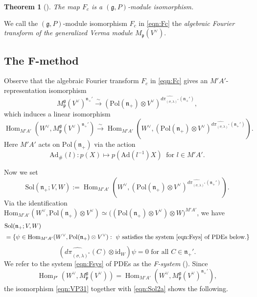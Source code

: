 \documentclass[reqno,11pt]{amsart}
\newtheorem{thm}[equation]{Theorem}
\theoremstyle{remark}
\theoremstyle{definition}
\numberwithin{equation}{section}
\newcommand{\fg}{{\mathfrak g}}
\newcommand{\fn}{{\mathfrak n}}
\newcommand{\fp}{{\mathfrak p}}
\newcommand{\Ad}{\mathrm{Ad}}
\newcommand{\Hom}{\operatorname{Hom}}
\newcommand{\Sol}{\mathrm{Sol}}
\newcommand{\Pol}{\mathrm{Pol}}
\newcommand{\To}{\longrightarrow}
\newcommand{\id}{\mathrm{id}}
\newcommand{\Mp}{M^{\fg}_{\fp}}
\begin{document}
\begin{thm}[{\cite[Sect.\ 3.4]{KP1}}]\label{def:AFT2}
The map $F_c$  is  a $(\mathfrak{g}, P)$-module isomorphism.
\end{thm}

We call 
the $(\mathfrak{g}, P)$-module isomorphism $F_c$ in \eqref{eqn:Fc} 
the \emph{algebraic Fourier transform of the generalized Verma module  $M_\fp(V^\vee)$}.

\subsection{The F-method}
\label{sec:Fmethod2}
Observe that
the algebraic Fourier transform
$F_c$  in \eqref{eqn:Fc} 
gives an $M'A'$-representation isomorphism
\begin{equation}\label{eqn:VP2}
\Mp(V^\vee)^{\fn_+'}
\stackrel{\sim}{\To}
(\Pol(\fn_+) 
\otimes V^\vee)^{\widehat{d\pi_{(\sigma,\lambda)^*}}(\fn_+')},
\end{equation}
which induces a linear isomorphism
\begin{equation}\label{eqn:VP31}
\operatorname{Hom}_{M'A'}(W^\vee,
\Mp(V^\vee)^{\fn_+'})
\stackrel{\sim}{\To}
\operatorname{Hom}_{M'A'}
\left(W^\vee,
(\mathrm{Pol}(\mathfrak{n}_+) 
\otimes V^\vee)^{\widehat{d\pi_{(\sigma,\lambda)^*}}(\fn_+')}\right).
\end{equation}
Here $M'A'$ acts on $\Pol(\fn_+)$ via the action
\begin{equation}\label{eqn:sharp}
\Ad_{\#}(l) \colon p(X) \mapsto p(\Ad(l^{-1})X)
\;\; \text{for $l \in M'A'$}.
\end{equation}

Now we set
\begin{equation}\label{eqn:Sol2a}
\mathrm{Sol}(\mathfrak n_+;V,W):=
\operatorname{Hom}_{M'A'}(W^\vee,
(\mathrm{Pol}(\mathfrak{n}_+) 
\otimes V^\vee)^{\widehat{d\pi_{(\sigma,\lambda)^*}}(\fn_+')}).
\end{equation}
Via the identification
$\textrm{Hom}_{M'A'}(W^\vee, \Pol(\fn_+)\otimes V^\vee)
\simeq
\big((\Pol(\fn_+)\otimes V^\vee) \otimes W\big)^{M'A'}$,
we have
\begin{align}\label{eqn:Sol}
&\Sol(\fn_+;V,W)\nonumber \\[3pt]
&=\{ \psi \in \Hom_{M'A'}(W^\vee, \Pol(\fn_+)\otimes V^\vee): 
\text{
$\psi$ satisfies the system \eqref{eqn:Fsys} of PDEs below.}\}
\end{align}
\begin{equation}\label{eqn:Fsys}
(\widehat{d\pi_{(\sigma,\lambda)^*}}(C) \otimes \id_W)\psi=0
\,\,
\text{for all $C \in \fn_+'$}.
\end{equation}
We refer to the system \eqref{eqn:Fsys} of PDEs 
as the \emph{F-system} (\cite[Fact 3.3 (3)]{KKP16}).
Since
\begin{equation*}%
\operatorname{Hom}_{P'}(W^\vee,\Mp(V^\vee))
=
\operatorname{Hom}_{M'A'}(W^\vee,\Mp(V^\vee)^{\fn_+'}),
\end{equation*}
the isomorphism \eqref{eqn:VP31} together with \eqref{eqn:Sol2a} shows the following.
\end{document}
